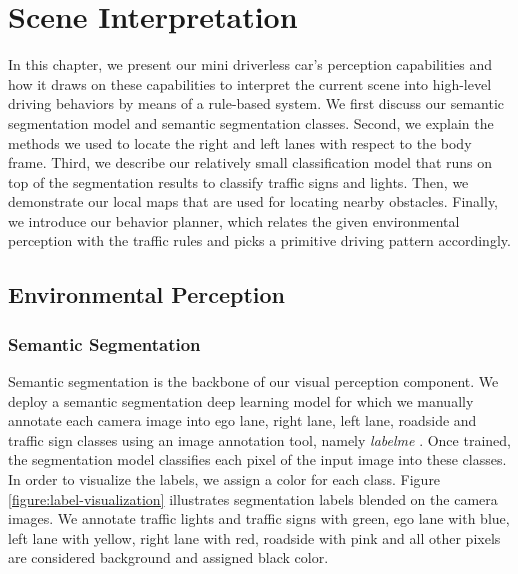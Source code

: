 \chapter{Scene Interpretation}
\label{chp:b4}

In this chapter, we present our mini driverless car's perception capabilities
and how it draws on these capabilities to interpret the current scene into
high-level driving behaviors by means of a rule-based system. We first discuss
our semantic segmentation model and semantic segmentation classes. Second, we
explain the methods we used to locate the right and left lanes with respect to
the body frame. Third, we describe our relatively small classification model
that runs on top of the segmentation results to classify traffic signs and
lights. Then, we demonstrate our local maps that are used for locating nearby
obstacles. Finally, we introduce our behavior planner, which relates the given
environmental perception with the traffic rules and picks a primitive driving
pattern accordingly.

\section{Environmental Perception}

\subsection{Semantic Segmentation}

Semantic segmentation is the backbone of our visual perception component. We
deploy a semantic segmentation deep learning model for which we manually
annotate each camera image into ego lane, right lane, left lane, roadside and
traffic sign classes using an image annotation tool, namely \textit{labelme}
\cite{Ketaro2016LM}. Once trained, the segmentation model classifies each pixel
of the input image into these classes. In order to visualize the labels, we
assign a color for each class. Figure \ref{figure:label-visualization}
illustrates segmentation labels blended on the camera images. We annotate
traffic lights and traffic signs with green, ego lane with blue, left lane with
yellow, right lane with red, roadside with pink and all other pixels are
considered background and assigned black color.


